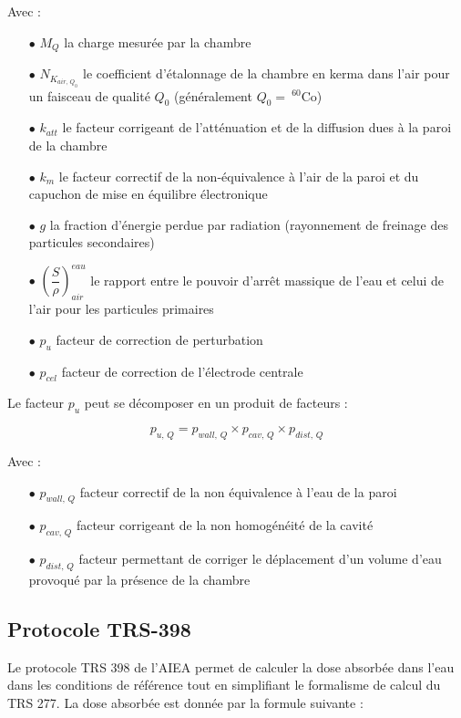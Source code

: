 \documentclass{article}
\begin{document}
Avec :

\begin{itemize}
  \item[$\bullet$] $M_Q$ la charge mesurée par la chambre
  \item[$\bullet$] $N_{K_{air, \, Q_0}}$ le coefficient d'étalonnage de la chambre en kerma dans l'air pour un faisceau de qualité $Q_0$ (généralement $Q_0  =\: ^{60}$Co)
  \item[$\bullet$] $k_{att}$ le facteur corrigeant de l'atténuation et de la diffusion dues à la paroi de la chambre
  \item[$\bullet$] $k_m$ le facteur correctif de la non-équivalence à l'air de la paroi et du capuchon de mise en équilibre électronique
  \item[$\bullet$] $g$ la fraction d'énergie perdue par radiation (rayonnement de freinage des particules secondaires)
  \item[$\bullet$] $\left(\dfrac{S}{\rho}\right) ^{eau}_{air}$ le rapport entre le pouvoir d'arrêt massique de l'eau et celui de l'air pour les particules primaires
  \item[$\bullet$] $p_u$ facteur de correction de perturbation
  \item[$\bullet$] $p_{cel}$ facteur de correction de l'électrode centrale
\end{itemize}

Le facteur $p_u$ peut se décomposer en un produit de facteurs :

\begin{equation}
  p_{u,\, Q} = p_{wall,\, Q} \times p_{cav,\, Q} \times p_{dist,\, Q}
  \label{eq_pu}
\end{equation}

Avec :
\begin{itemize}
  \item[$\bullet$] $p_{wall,\, Q}$ facteur correctif de la non équivalence à l'eau de la paroi
  \item[$\bullet$] $p_{cav,\, Q}$ facteur corrigeant de la non homogénéité de la cavité
  \item[$\bullet$] $p_{dist,\, Q}$ facteur permettant de corriger le déplacement d'un volume d'eau provoqué par la présence de la chambre
\end{itemize}

\subsection{Protocole TRS-398}

Le protocole TRS 398 de l'AIEA \cite{international2001iaea} permet de calculer la dose absorbée dans l'eau dans les conditions de référence tout en simplifiant le formalisme de calcul du TRS 277. La dose absorbée est donnée par la formule suivante :
\end{document}
